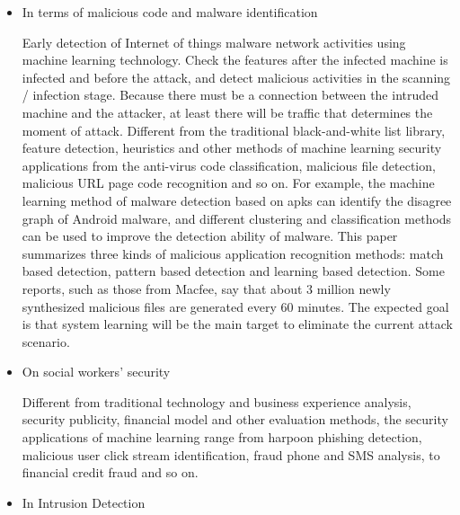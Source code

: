 \documentclass[UTF8]{article}
\begin{document}
\begin{itemize}
\item In terms of malicious code and malware identification

	Early detection of Internet of things malware network activities using machine learning technology. Check the features after the infected machine is infected and before the attack, and detect malicious activities in the scanning / infection stage. Because there must be a connection between the intruded machine and the attacker, at least there will be traffic that determines the moment of attack. \cite{Early Detection of IoT Malware Network Activity Using Machine Learning Techniques}Different from the traditional black-and-white list library, feature detection, heuristics and other methods of machine learning security applications from the anti-virus code classification, malicious file detection, malicious URL page code recognition and so on. For example, the machine learning method of malware detection based on apks can identify the disagree graph of Android malware, and different clustering and classification methods can be used to improve the detection ability of malware. This paper summarizes three kinds of malicious application recognition methods: match based detection, pattern based detection and learning based detection. \cite{State key laboratory of Computer Science, Institute of Software}Some reports, such as those from Macfee, say that about 3 million newly synthesized malicious files are generated every 60 minutes. The expected goal is that system learning will be the main target to eliminate the current attack scenario. \cite{Mayur Rele Cyber Security: Threat Detection Model based on Machine learning Algorithm}
	
\item	On social workers' security

Different from traditional technology and business experience analysis, security publicity, financial model and other evaluation methods, the security applications of machine learning range from harpoon phishing detection, malicious user click stream identification, fraud phone and SMS analysis, to financial credit fraud and so on.

\item  In Intrusion Detection


\end{itemize}
\end{document}
